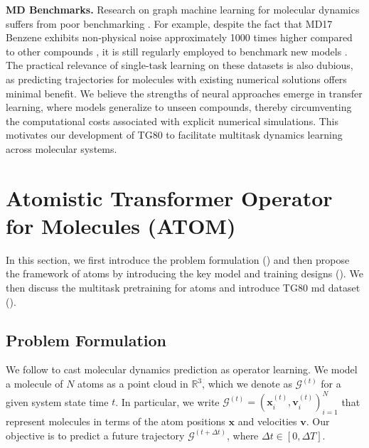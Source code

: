 
\textbf{MD Benchmarks.}
Research on graph machine learning for molecular dynamics suffers from poor benchmarking \cite{bechler-speicher_position_2025}. 
For example, despite the fact that MD17 Benzene exhibits non-physical noise approximately 1000 times higher compared to other compounds \cite{christensen_role_2020}, it is still regularly employed to benchmark new models \cite{bihani_egraffbench_2023,huang_equivariant_2022,liao_equiformer_2023, xu_equivariant_2024}. The practical relevance of single-task learning on these datasets is also dubious, as predicting trajectories for molecules with existing numerical solutions offers minimal benefit. We believe the strengths of neural approaches emerge in transfer learning, where models generalize to unseen compounds, thereby circumventing the computational costs associated with explicit numerical simulations. This motivates our development of TG80 to facilitate multitask dynamics learning across molecular systems.



\section{Atomistic Transformer Operator for Molecules (ATOM)}
\label{sect:atom}

In this section, we first introduce the problem formulation () and then propose the framework of \gls{atoms} by introducing the key model and training designs (). We then discuss the multitask pretraining for \gls{atoms} and introduce TG80 \gls{md} dataset ().


\subsection{Problem Formulation}
\label{sect:problem}
We follow \cite{xu_equivariant_2024} to cast molecular dynamics prediction as operator learning. We model a molecule of $N$ atoms as a point cloud in $\mathbb R^3$, which we denote as $\mathcal{G}^{(t)}$ for a given system state time $t$. In particular, we write $\mathcal{G}^{(t)} = (\mathbf x_i^{(t)}, \mathbf v_i^{(t)})_{i= 1}^N$ that represent molecules in terms of the atom positions $\mathbf{x}$ and velocities $\mathbf{v}$.
Our objective is to predict a future trajectory $\mathcal{G}^{(t + \Delta t)}$, where $\Delta t \in [0, \Delta T]$. 

